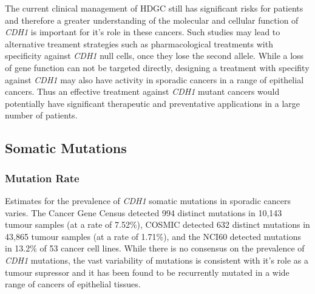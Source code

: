 The current clinical management of HDGC still has significant risks for patients and therefore a greater understanding of the molecular and cellular function of \textit{CDH1} is important for it's role in these cancers. Such studies may lead to alternative treament strategies such as pharmacological treatments with specificity against \textit{CDH1} null cells, once they lose the second allele. While a loss of gene function can not be targeted directly, designing a treatment with specifity against \textit{CDH1} may also have activity in sporadic cancers in a range of epithelial cancers. Thus an effective treatment against \textit{CDH1} mutant cancers would potentially have significant therapeutic and preventative applications in a large number of patients.

\subsection{Somatic Mutations}
\subsubsection{Mutation Rate}

Estimates for the prevalence of \textit{CDH1} somatic mutations  in sporadic cancers varies. The Cancer Gene Census detected 994 distinct mutations in 10,143 tumour samples (at a rate of 7.52\%), COSMIC detected 632 distinct mutations in 43,865 tumour samples (at a rate of 1.71\%), and the NCI60 detected mutations in 13.2\% of 53 cancer cell lines. While there is no consensus on the prevalence of \textit{CDH1} mutations, the vast variability of mutations is consistent with it's role as a tumour supressor and it has been found to be recurrently mutated in a wide range of cancers of epithelial tissues.

